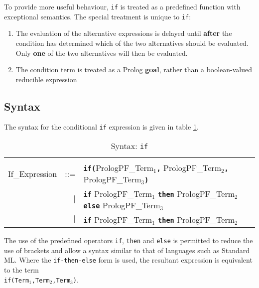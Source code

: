 To provide more useful behaviour, \texttt{if} is treated as a predefined
function with exceptional semantics.  The special treatment is unique
to \texttt{if}:
\begin{enumerate}
\item{The evaluation of the alternative expressions is delayed until
      \textbf{after} the condition has determined which of the
      two alternatives should be evaluated.  Only \textbf{one} of the
      two alternatives will then be evaluated.}
\item{The condition term is treated as a Prolog \textbf{goal}, rather
      than a boolean-valued reducible expression}
\end{enumerate}

\subsection{Syntax}

The syntax for the conditional \texttt{if} expression is given in
table \ref{syntax:if}.

\begin{table}
{\small
\begin{tabular}{| l r l |}
\hline
 & & \\
If\_{}Expression & ::= & \texttt{\textbf{if(}}PrologPF\_{}Term$_1$\texttt{\textbf{,}}
                                              PrologPF\_{}Term$_2$\texttt{\textbf{,}}
                                              PrologPF\_{}Term$_3$\texttt{\textbf{)}}\\
 & $|$ &  \texttt{\textbf{if}} PrologPF\_{}Term$_1$ \texttt{\textbf{then}}
                               PrologPF\_{}Term$_2$ \texttt{\textbf{else}}
                               PrologPF\_{}Term$_3$\\
 & $|$ &  \texttt{\textbf{if}} PrologPF\_{}Term$_1$ \texttt{\textbf{then}}
                               PrologPF\_{}Term$_2$\\[4mm]
\hline
\end{tabular}
}
\caption{Syntax: \texttt{if}}
\label{syntax:if}
\end{table}

The use of the predefined operators \texttt{if}, \texttt{then} and \texttt{else}
is permitted to reduce the use of brackets and allow a syntax similar to that
of languages such as Standard ML.  Where the \texttt{if-then-else} form is used,
the resultant expression is equivalent to the term\\
\texttt{if(Term$_1$,Term$_2$,Term$_3$)}.

